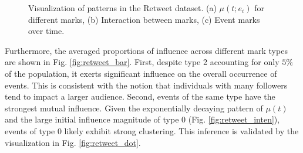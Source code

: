 \begin{figure}
    \centering
     \hspace{5mm}
    \caption{\small Visualization of patterns in the Retweet dataset. (a) $\mu(t; e_i)$ for different marks, (b) Interaction between marks, (c) Event marks over time.}
    \label{fig:retweet pattern}
\end{figure}

Furthermore, the averaged proportions of influence across different mark types are shown in Fig. \ref{fig:retweet_bar}.  
First, despite type 2 accounting for only $5\%$ of the population, it exerts significant influence on the overall occurrence of events.  
This is consistent with the notion that individuals with many followers tend to impact a larger audience.  
Second, events of the same type have the strongest mutual influence.  
Given the exponentially decaying pattern of $\mu(t)$ and the large initial influence magnitude of type 0 (Fig. \ref{fig:retweet_inten}), events of type 0 likely exhibit strong clustering.  
This inference is validated by the visualization in Fig. \ref{fig:retweet_dot}.



